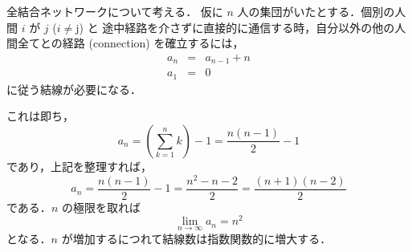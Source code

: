 \color[cmyk]{0,0,0,.3}
全結合ネットワークについて考える．
仮に $n$ 人の集団がいたとする．個別の人間 $i$ が $j$ ($i \ne $j) と
途中経路を介さずに直接的に通信する時，自分以外の他の人間全てとの経路
(connection) を確立するには，
\begin{eqnarray*}
 a_n & = & a_{n-1} + n \\
 a_1 & = & 0
 \end{eqnarray*}
に従う結線が必要になる．

これは即ち，
\[  
  a_n = \left(\sum^{n}_{k = 1} k\right) - 1 = \frac{n (n-1)}{2} -1
\]
であり，上記を整理すれば，
\[
  a_n = \frac{n (n-1)}{2} -1 = \frac{n^2-n-2}{2} = \frac{(n+1) (n-2)}{2}
\]
である．$n$ の極限を取れば
\[
  \lim_{n \rightarrow \infty} a_n = n^2
\]
となる．$n$ が増加するにつれて結線数は指数関数的に増大する．
